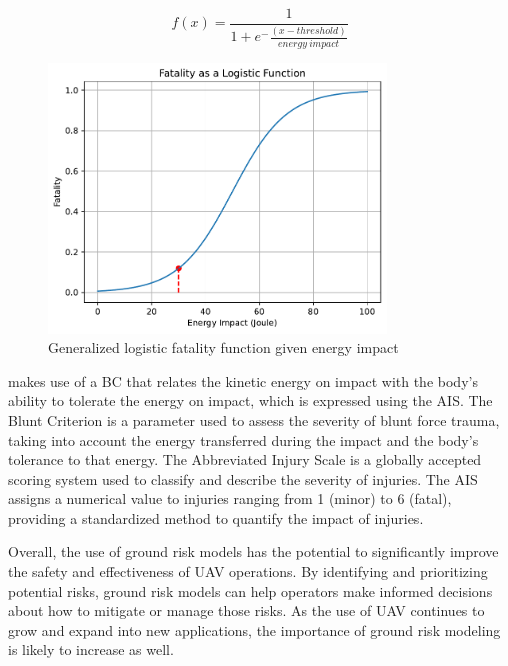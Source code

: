 \documentclass[12pt]{report}
\begin{document}
            \begin{equation}\label{eq:logistic}
                f(x) = \frac{1}{1+e^-\frac{(x-threshold)}{energy \ impact}}
            \end{equation}

            \begin{figure}[H]
                \centering
                \includegraphics[width=0.8\textwidth]{Plot/logistic_bounded.pdf}
                \caption{Generalized logistic fatality function given energy impact}
                \label{fig:logistic}
            \end{figure}

            \cite{magister_small_2010} makes use of a \ac{BC} that relates the kinetic energy on impact with the body's
            ability to tolerate the energy on impact, which is expressed using the \ac{AIS}. The Blunt Criterion is a
            parameter used to assess the severity of blunt force trauma, taking into account the energy transferred
            during the impact and the body's tolerance to that energy. The Abbreviated Injury Scale  is a globally
            accepted scoring system used to classify and describe the severity of injuries. The AIS assigns a numerical
            value to injuries ranging from 1 (minor) to 6 (fatal), providing a standardized method to quantify the
            impact of injuries.

        Overall, the use of ground risk models has the potential to significantly improve the safety and
        effectiveness of UAV operations. By identifying and prioritizing potential risks, ground risk models can help
        operators make informed decisions about how to mitigate or manage those risks. As the use of UAV continues to
        grow and expand into new applications, the importance of ground risk modeling is likely to increase as well.
\end{document}

